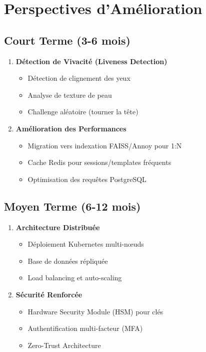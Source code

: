 \documentclass[12pt,a4paper]{report}
\begin{document}
\section{Perspectives d'Amélioration}

\subsection{Court Terme (3-6 mois)}

\begin{enumerate}
    \item \textbf{Détection de Vivacité (Liveness Detection)}
    \begin{itemize}
        \item Détection de clignement des yeux
        \item Analyse de texture de peau
        \item Challenge aléatoire (tourner la tête)
    \end{itemize}
    
    \item \textbf{Amélioration des Performances}
    \begin{itemize}
        \item Migration vers indexation FAISS/Annoy pour 1:N
        \item Cache Redis pour sessions/templates fréquents
        \item Optimisation des requêtes PostgreSQL
    \end{itemize}
\end{enumerate}

\subsection{Moyen Terme (6-12 mois)}

\begin{enumerate}
    \item \textbf{Architecture Distribuée}
    \begin{itemize}
        \item Déploiement Kubernetes multi-nœuds
        \item Base de données répliquée
        \item Load balancing et auto-scaling
    \end{itemize}
    
    \item \textbf{Sécurité Renforcée}
    \begin{itemize}
        \item Hardware Security Module (HSM) pour clés
        \item Authentification multi-facteur (MFA)
        \item Zero-Trust Architecture
    \end{itemize}
\end{enumerate}
\end{document}
